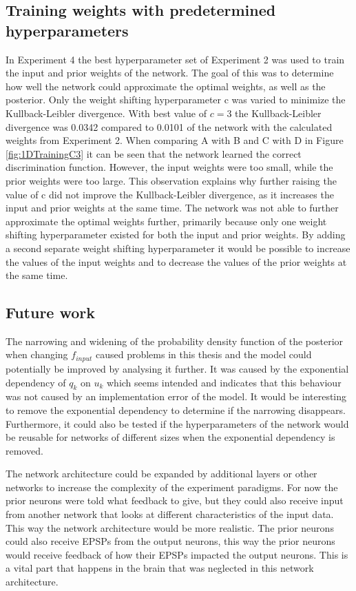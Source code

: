 \subsection{Training weights with predetermined hyperparameters}
In Experiment 4 the best hyperparameter set of Experiment 2 was used to train the input and prior weights of the network. The goal of this was to determine how well the network could approximate the optimal weights, as well as the posterior. Only the weight shifting hyperparameter c was varied to minimize the Kullback-Leibler divergence. With best value of $c = 3$ the Kullback-Leibler divergence was 0.0342 compared to 0.0101 of the network with the calculated weights from Experiment 2. When comparing A with B and C with D in Figure \ref{fig:1DTrainingC3} it can be seen that the network learned the correct discrimination function. However, the input weights were too small, while the prior weights were too large. This observation explains why further raising the value of c did not improve the Kullback-Leibler divergence, as it increases the input and prior weights at the same time. The network was not able to further approximate the optimal weights further, primarily because only one weight shifting hyperparameter existed for both the input and prior weights. By adding a second separate weight shifting hyperparameter it would be possible to increase the values of the input weights and to decrease the values of the prior weights at the same time.

\subsection{Future work}
The narrowing and widening of the probability density function of the posterior when changing $f_{input}$ caused problems in this thesis and the model could potentially be improved by analysing it further. It was caused by the exponential dependency of $q_k$ on $u_k$ which seems intended and indicates that this behaviour was not caused by an implementation error of the model. It would be interesting to remove the exponential dependency to determine if the narrowing disappears. Furthermore, it could also be tested if the hyperparameters of the network would be reusable for networks of different sizes when the exponential dependency is removed.

The network architecture could be expanded by additional layers or other networks to increase the complexity of the experiment paradigms. For now the prior neurons were told what feedback to give, but they could also receive input from another network that looks at different characteristics of the input data. This way the network architecture would be more realistic. The prior neurons could also receive EPSPs from the output neurons, this way the prior neurons would receive feedback of how their EPSPs impacted the output neurons. This is a vital part that happens in the brain that was neglected in this network architecture.

